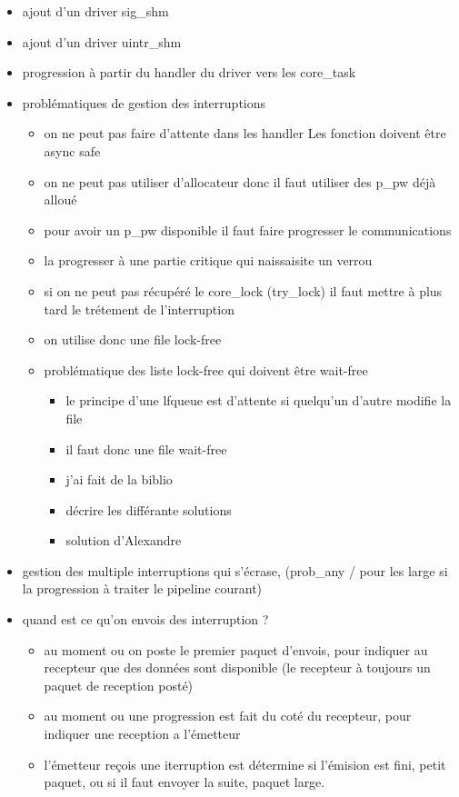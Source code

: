 \begin{itemize}
  \item ajout d'un driver sig_shm
  \item ajout d'un driver uintr_shm
  \item progression à partir du handler du driver vers les core_task
  \item problématiques de gestion des interruptions
  \begin{itemize}
    \item on ne peut pas faire d'attente dans les handler
    Les fonction doivent être async safe
    \item on ne peut pas utiliser d'allocateur donc il faut utiliser des p_pw déjà alloué
    \item pour avoir un p_pw disponible il faut faire progresser le communications
    \item la progresser à une partie critique qui naissaisite un verrou
    \item si on ne peut pas récupéré le core_lock (try_lock) il faut mettre à plus tard le trétement de l'interruption
    \item on utilise donc une file lock-free
    \item problématique des liste lock-free qui doivent être wait-free
    \begin{itemize}
      \item le principe d'une lfqueue est d'attente si quelqu'un d'autre modifie la file
      \item il faut donc une file wait-free
      \item j'ai fait de la biblio
      \item décrire les différante solutions
      \item solution d'Alexandre
    \end{itemize}
  \end{itemize}
  \item gestion des multiple interruptions qui s'écrase, (prob_any / pour les large si la progression à traiter le pipeline courant)
  \item quand est ce qu'on envois des interruption ?
  \begin{itemize}
    \item au moment ou on poste le premier paquet d'envois, pour indiquer au recepteur que des données sont disponible (le recepteur à toujours un paquet de reception posté)
    \item au moment ou une progression est fait du coté du recepteur, pour indiquer une reception a l'émetteur
    \item l'émetteur reçois une iterruption est détermine si l'émision est fini, petit paquet, ou si il faut envoyer la suite, paquet large.
  \end{itemize}
\end{itemize}

